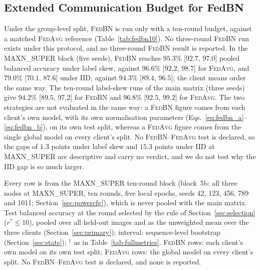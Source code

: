 \documentclass[journal]{IEEEtran}
\newcommand{\fedavg}{\textsc{FedAvg}}
\newcommand{\fedbn}{\textsc{FedBN}}
\begin{document}
\subsection{Extended Communication Budget for FedBN}
\label{sec:res_fedbn}

Under the group-level split, \fedbn{} is run only with a ten-round budget, against a matched \fedavg{} reference (Table~\ref{tab:fedbn10}). No three-round \fedbn{} run exists under this protocol, and no three-round \fedbn{} result is reported. In the MAXN\_SUPER block (five seeds), \fedbn{} reaches $95.3$\% [$92.7$, $97.0$] pooled balanced accuracy under label skew, against $96.6$\% [$92.2$, $98.7$] for \fedavg{}, and $79.0$\% [$70.1$, $87.6$] under IID, against $94.3$\% [$89.4$, $96.5$]; the client means order the same way. The ten-round label-skew runs of the main matrix (three seeds) give $94.2$\% [$89.5$, $97.2$] for \fedbn{} and $96.8$\% [$92.5$, $99.2$] for \fedavg{}. The two strategies are not evaluated in the same way: a \fedbn{} figure comes from each client's own model, with its own normalisation parameters (Eqs.~\eqref{eq:fedbn_a}--\eqref{eq:fedbn_b}), on its own test split, whereas a \fedavg{} figure comes from the single global model on every client's split. No \fedbn{}--\fedavg{} test is declared, so the gaps of $1.3$ points under label skew and $15.3$ points under IID at MAXN\_SUPER are descriptive and carry no verdict, and we do not test why the IID gap is so much larger.

\begin{table}[t]
\centering
\caption{\fedbn{} Under an Extended Communication Budget: the MAXN\_SUPER Ten-Round Family (Block~5b; 3-Node, Group-Level Split, $n=5$ Seeds, Balanced Accuracy mean [95\% CI])}
\label{tab:fedbn10}

\vspace{2pt}
\footnotesize{Every row is from the MAXN\_SUPER ten-round block (block~5b: all three nodes at MAXN\_SUPER, ten rounds, five local epochs, seeds 42, 123, 456, 789 and 1011; Section~\ref{sec:powercfg}), which is never pooled with the main matrix. Test balanced accuracy at the round selected by the rule of Section~\ref{sec:selection} ($r^{*} \le 10$), pooled over all held-out images and as the unweighted mean over the three clients (Section~\ref{sec:primary}); interval: sequence-level bootstrap (Section~\ref{sec:stats}); $^{\dagger}$ as in Table~\ref{tab:fullmetrics}. \fedbn{} rows: each client's own model on its own test split; \fedavg{} rows: the global model on every client's split. No \fedbn{}--\fedavg{} test is declared, and none is reported.}
\end{table}
\end{document}
